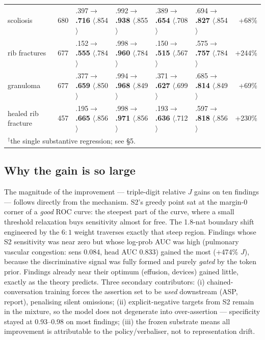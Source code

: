 \documentclass[10pt,a4paper]{article}
\begin{document}
\begin{table}[h]
\begin{tabular}{lrllllr}
scoliosis & 680 & .397$\to$\textbf{.716} $\langle$.854$\rangle$ & .992$\to$\textbf{.938} $\langle$.855$\rangle$ & .389$\to$\textbf{.654} $\langle$.708$\rangle$ & .694$\to$\textbf{.827} $\langle$.854$\rangle$ & +68\% \\
rib fractures & 677 & .152$\to$\textbf{.555} $\langle$.784$\rangle$ & .998$\to$\textbf{.960} $\langle$.784$\rangle$ & .150$\to$\textbf{.515} $\langle$.567$\rangle$ & .575$\to$\textbf{.757} $\langle$.784$\rangle$ & +244\% \\
granuloma & 677 & .377$\to$\textbf{.659} $\langle$.850$\rangle$ & .994$\to$\textbf{.968} $\langle$.849$\rangle$ & .371$\to$\textbf{.627} $\langle$.699$\rangle$ & .685$\to$\textbf{.814} $\langle$.849$\rangle$ & +69\% \\
healed rib fracture & 457 & .195$\to$\textbf{.665} $\langle$.856$\rangle$ & .998$\to$\textbf{.971} $\langle$.856$\rangle$ & .193$\to$\textbf{.636} $\langle$.712$\rangle$ & .597$\to$\textbf{.818} $\langle$.856$\rangle$ & +230\% \\
\bottomrule
\multicolumn{7}{l}{\scriptsize $^{\dagger}$the single substantive regression; see \S5.}
\end{tabular}
\end{table}

\subsection{Why the gain is so large}

The magnitude of the improvement --- triple-digit relative $J$ gains on ten findings ---
follows directly from the mechanism. S2's greedy point sat at the margin-0 corner of a
\emph{good} ROC curve: the steepest part of the curve, where a small threshold
relaxation buys sensitivity almost for free. The 1.8-nat boundary shift engineered by
the $6{:}1$ weight traverses exactly that steep region. Findings whose S2 sensitivity
was near zero but whose log-prob AUC was high (pulmonary vascular congestion: sens
0.084, head AUC 0.833) gained the most (+474\% $J$), because the discriminative signal
was fully formed and purely \emph{gated} by the token prior. Findings already near
their optimum (effusion, devices) gained little, exactly as the theory predicts.
Three secondary contributors: (i) chained-conversation training forces the assertion
set to be \emph{used} downstream (ASP, report), penalising silent omissions;
(ii) explicit-negative targets from S2 remain in the mixture, so the model does not
degenerate into over-assertion --- specificity stayed at 0.93--0.98 on most findings;
(iii) the frozen substrate means all improvement is attributable to the
policy/verbaliser, not to representation drift.
\end{document}
